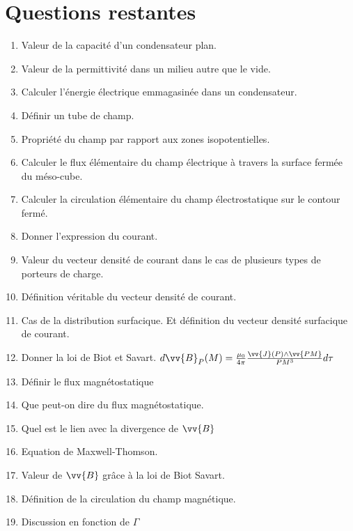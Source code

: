 \documentclass[a4paper, 11pt, hidelinks]{article}
\begin{document}
\section{Questions restantes}
\begin{enumerate}
    \item Valeur de la capacité d'un condensateur plan. \cite{Chapitre9}
    \item Valeur de la permittivité dans un milieu autre que le vide. \cite{Chapitre9}
    \item Calculer l'énergie électrique emmagasinée dans un condensateur. \cite{Chapitre9}
    \item Définir un tube de champ. \cite{Chapitre9}
    \item Propriété du champ par rapport aux zones isopotentielles. \cite{Chapitre9}
    \item Calculer le flux élémentaire du champ électrique à travers la surface fermée du méso-cube. \cite{Chapitre10}
    \item Calculer la circulation élémentaire du champ électrostatique sur le contour fermé. \cite{Chapitre10}
    \item Donner l'expression du courant. \cite{Chapitre11}
    \item Valeur du vecteur densité de courant dans le cas de plusieurs types de porteurs de charge. \cite{Chapitre11}
    \item Définition véritable du vecteur densité de courant. \cite{Chapitre11}
    \item Cas de la distribution surfacique. Et définition du vecteur densité surfacique de courant. \cite{Chapitre11}
    \item Donner la loi de Biot et Savart. $d\vv{B}_P(M)=\frac{\mu_0}{4 \pi}\frac{\vv{J}(P)\land \vv{PM}}{PM^3}d\tau$ \cite{Chapitre11}
    \item Définir le flux magnétostatique \cite{Chapitre11}
    \item Que peut-on dire du flux magnétostatique. \cite{Chapitre11}
    \item Quel est le lien avec la divergence de $\vv{B}$ \cite{Chapitre11}
    \item Equation de Maxwell-Thomson. \cite{Chapitre11}
    \item Valeur de $\vv{B}$ grâce à la loi de Biot Savart. \cite{Chapitre11}
    \item Définition de la circulation du champ magnétique. \cite{Chapitre11}
    \item Discussion en fonction de $\Gamma$ \cite{Chapitre11}

\end{enumerate}
\end{document}
